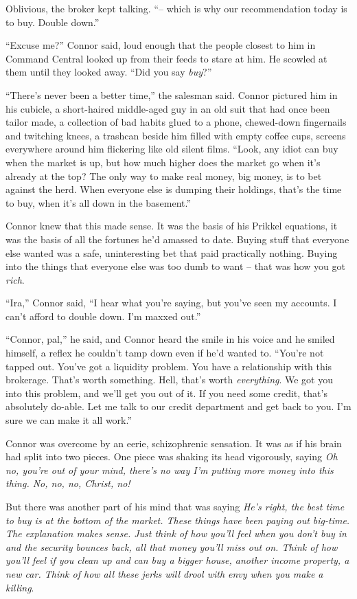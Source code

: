 Oblivious, the broker kept talking. ``-- which is why our
recommendation today is to buy. Double down.''

``Excuse me?'' Connor said, loud enough that the people closest to
him in Command Central looked up from their feeds to stare at him.
He scowled at them until they looked away. ``Did you say
\emph{buy}?''

``There's never been a better time,'' the salesman said. Connor
pictured him in his cubicle, a short-haired middle-aged guy in an
old suit that had once been tailor made, a collection of bad habits
glued to a phone, chewed-down fingernails and twitching knees, a
trashcan beside him filled with empty coffee cups, screens
everywhere around him flickering like old silent films. ``Look, any
idiot can buy when the market is up, but how much higher does the
market go when it's already at the top? The only way to make real
money, big money, is to bet against the herd. When everyone else is
dumping their holdings, that's the time to buy, when it's all down
in the basement.''

Connor knew that this made sense. It was the basis of his Prikkel
equations, it was the basis of all the fortunes he'd amassed to
date. Buying stuff that everyone else wanted was a safe,
uninteresting bet that paid practically nothing. Buying into the
things that everyone else was too dumb to want -- that was how you
got \emph{rich}.

``Ira,'' Connor said, ``I hear what you're saying, but you've seen my
accounts. I can't afford to double down. I'm maxxed out.''

``Connor, pal,'' he said, and Connor heard the smile in his voice and
he smiled himself, a reflex he couldn't tamp down even if he'd
wanted to. ``You're not tapped out. You've got a liquidity problem.
You have a relationship with this brokerage. That's worth
something. Hell, that's worth \emph{everything}. We got you into
this problem, and we'll get you out of it. If you need some credit,
that's absolutely do-able. Let me talk to our credit department and
get back to you. I'm sure we can make it all work.''

Connor was overcome by an eerie, schizophrenic sensation. It was as
if his brain had split into two pieces. One piece was shaking its
head vigorously, saying
\emph{Oh no, you're out of your mind, there's no way I'm putting more money into this thing. No, no, no, Christ, no!}

But there was another part of his mind that was saying
\emph{He's right, the best time to buy is at the bottom of the market. These things have been paying out big-time. The explanation makes sense. Just think of how you'll feel when you don't buy in and the security bounces back, all that money you'll miss out on. Think of how you'll feel if you clean up and can buy a bigger house, another income property, a new car. Think of how all these jerks will drool with envy when you make a killing}.

